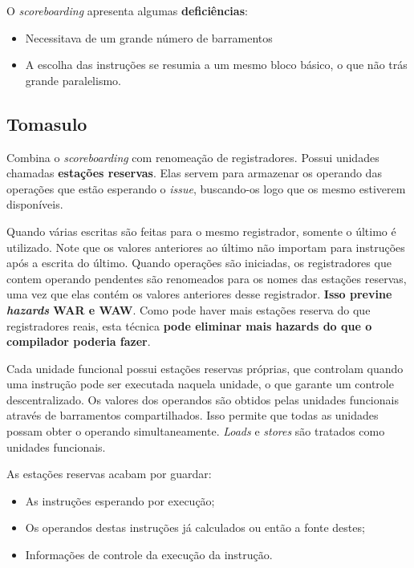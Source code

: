 O \textit{scoreboarding} apresenta algumas \textbf{deficiências}:
\begin{itemize}
  \item Necessitava de um grande número de barramentos

  \item A escolha das instruções se resumia a um mesmo bloco básico, o que não trás grande paralelismo.
\end{itemize}




\subsection{Tomasulo}
Combina o \textit{scoreboarding} com renomeação de registradores. Possui unidades chamadas \textbf{estações reservas}. Elas servem para armazenar os operando das operações que estão esperando o \textit{issue}, buscando-os logo que os mesmo estiverem disponíveis.

Quando várias escritas são feitas para o mesmo registrador, somente o último é utilizado. Note que os valores anteriores ao último não importam para instruções após a escrita do último. Quando operações são iniciadas, os registradores que contem operando pendentes são renomeados para os nomes das estações reservas, uma vez que elas contém os valores anteriores desse registrador. \textbf{Isso previne \textit{hazards} WAR e WAW}. Como pode haver mais estações reserva do que registradores reais, esta técnica \textbf{pode eliminar mais hazards do que o compilador poderia fazer}.

Cada unidade funcional possui estações reservas próprias, que controlam quando uma instrução pode ser executada naquela unidade, o que garante um controle descentralizado. Os valores dos operandos são obtidos pelas unidades funcionais através de barramentos compartilhados. Isso permite que todas as unidades possam obter o operando simultaneamente. \textit{Loads} e \textit{stores} são tratados como unidades funcionais.

As estações reservas acabam por guardar:
\begin{itemize}
  \item As instruções esperando por execução;
  \item Os operandos destas instruções já calculados ou então a fonte destes;
  \item Informações de controle da execução da instrução.
\end{itemize}

